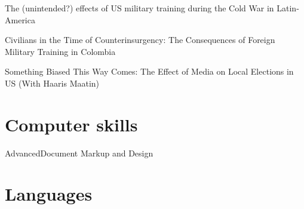 \documentclass{moderncv}
\begin{document}
{The (unintended?) effects of US military training during the Cold War in Latin-America \\}

{Civilians in the Time of Counterinsurgency: The Consequences of Foreign Military Training in Colombia \\}

{Something Biased This Way Comes: The Effect of Media on Local Elections in US (With Haaris Maatin) }


\section{\textbf{Computer skills}}
 {Advanced}{Document Markup and Design}


\section{\textbf{Languages}}
\end{document}
